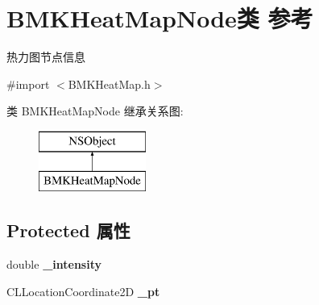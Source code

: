 \hypertarget{interface_b_m_k_heat_map_node}{\section{B\+M\+K\+Heat\+Map\+Node类 参考}
\label{interface_b_m_k_heat_map_node}
}


热力图节点信息  




{\ttfamily \#import $<$B\+M\+K\+Heat\+Map.\+h$>$}

类 B\+M\+K\+Heat\+Map\+Node 继承关系图\+:\begin{figure}[H]
\begin{center}
\leavevmode
\includegraphics[height=2.000000cm]{interface_b_m_k_heat_map_node}
\end{center}
\end{figure}
\subsection*{Protected 属性}
\begin{DoxyCompactItemize}
\item 
\hypertarget{interface_b_m_k_heat_map_node_af1afa300b9057a129abdf531405fb4bf}{double {\bfseries \+\_\+intensity}}\label{interface_b_m_k_heat_map_node_af1afa300b9057a129abdf531405fb4bf}

\item 
\hypertarget{interface_b_m_k_heat_map_node_a52a3c9cf57869c93e99aae094f44edec}{C\+L\+Location\+Coordinate2\+D {\bfseries \+\_\+pt}}\label{interface_b_m_k_heat_map_node_a52a3c9cf57869c93e99aae094f44edec}

\end{DoxyCompactItemize}
